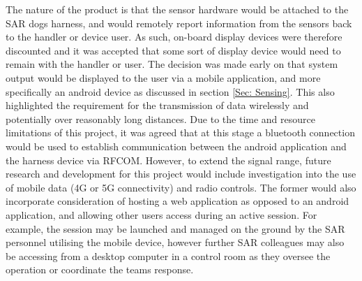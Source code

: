 \documentclass{ueacmpstyle}
\begin{document}
        The nature of the product is that the sensor hardware would be attached to the SAR dogs harness, and would remotely report information from the sensors back to the handler or device user.  As such, on-board display devices were therefore discounted and it was accepted that some sort of display device would need to remain with the handler or user.  The decision was made early on that system output would be displayed to the user via a mobile application, and more specifically an android device as discussed in section \ref{Sec: Sensing}.  This also highlighted the requirement for the transmission of data wirelessly and potentially over reasonably long distances.  Due to the time and resource limitations of this project, it was agreed that at this stage a bluetooth connection would be used to establish communication between the android application and the harness device via RFCOM.  However, to extend the signal range, future research and development for this project would include investigation into the use of mobile data (4G or 5G connectivity) and radio controls.  The former would also incorporate consideration of hosting a web application as opposed to an android application, and allowing other users access during an active session.  For example, the session may be launched and managed on the ground by the SAR personnel utilising the mobile device, however further SAR colleagues may also be accessing from a desktop computer in a control room as they oversee the operation or coordinate the teams response.
        
\end{document}

